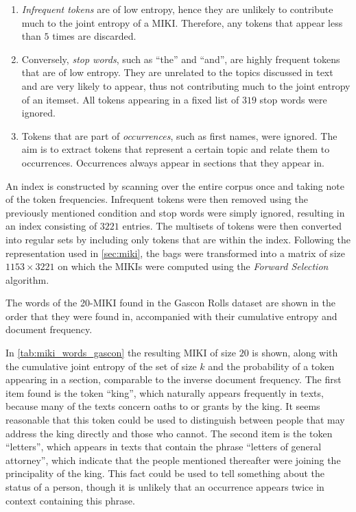 \begin{enumerate}
    \item \emph{Infrequent tokens} are of low entropy, hence they are unlikely to contribute much to the joint entropy of a MIKI. Therefore, any tokens that appear less than $5$ times are discarded.
    \item Conversely, \emph{stop words}, such as ``the'' and ``and'', are highly frequent tokens that are of low entropy. They are unrelated to the topics discussed in text and are very likely to appear, thus not contributing much to the joint entropy of an itemset. All tokens appearing in a fixed list of $319$ stop words were ignored.
    \item Tokens that are part of \emph{occurrences}, such as first names, were ignored. The aim is to extract tokens that represent a certain topic and relate them to occurrences. Occurrences always appear in sections that they appear in.
\end{enumerate}

An index is constructed by scanning over the entire corpus once and taking note of the token frequencies.
Infrequent tokens were then removed using the previously mentioned condition and stop words were simply ignored, resulting in an index consisting of $3221$ entries.
The multisets of tokens were then converted into regular sets by including only tokens that are within the index. 
Following the representation used in \cref{sec:miki}, the bags were transformed into a matrix of size $1153 \times 3221$ on which the MIKIs were computed using the \emph{Forward Selection} algorithm.

\begin{table}
    \centering
    
    \caption{The words of the 20-MIKI found in the Gascon Rolls dataset are shown in the order that they were found in, accompanied with their cumulative entropy and document frequency.}
    \label{tab:miki_words_gascon}
\end{table}

In \cref{tab:miki_words_gascon} the resulting MIKI of size $20$ is shown, along with the cumulative joint entropy of the set of size $k$ and the probability of a token appearing in a section, comparable to the inverse document frequency.
The first item found is the token ``king'', which naturally appears frequently in texts, because many of the texts concern oaths to or grants by the king.
It seems reasonable that this token could be used to distinguish between people that may address the king directly and those who cannot.
The second item is the token ``letters'', which appears in texts that contain the phrase ``letters of general attorney'', which indicate that the people mentioned thereafter were joining the principality of the king.
This fact could be used to tell something about the status of a person, though it is unlikely that an occurrence appears twice in context containing this phrase.

